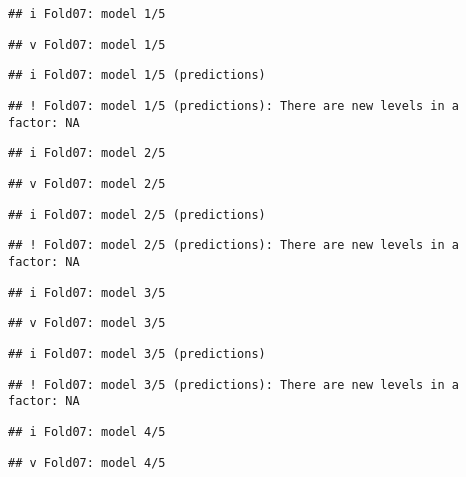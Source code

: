 \documentclass[
]{article}
\begin{document}
\begin{verbatim}
## i Fold07: model 1/5
\end{verbatim}

\begin{verbatim}
## v Fold07: model 1/5
\end{verbatim}

\begin{verbatim}
## i Fold07: model 1/5 (predictions)
\end{verbatim}

\begin{verbatim}
## ! Fold07: model 1/5 (predictions): There are new levels in a factor: NA
\end{verbatim}

\begin{verbatim}
## i Fold07: model 2/5
\end{verbatim}

\begin{verbatim}
## v Fold07: model 2/5
\end{verbatim}

\begin{verbatim}
## i Fold07: model 2/5 (predictions)
\end{verbatim}

\begin{verbatim}
## ! Fold07: model 2/5 (predictions): There are new levels in a factor: NA
\end{verbatim}

\begin{verbatim}
## i Fold07: model 3/5
\end{verbatim}

\begin{verbatim}
## v Fold07: model 3/5
\end{verbatim}

\begin{verbatim}
## i Fold07: model 3/5 (predictions)
\end{verbatim}

\begin{verbatim}
## ! Fold07: model 3/5 (predictions): There are new levels in a factor: NA
\end{verbatim}

\begin{verbatim}
## i Fold07: model 4/5
\end{verbatim}

\begin{verbatim}
## v Fold07: model 4/5
\end{verbatim}
\end{document}
